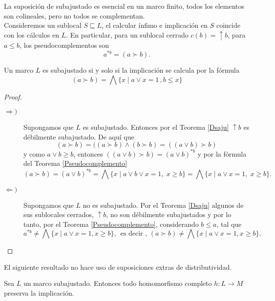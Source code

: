 La suposición de subajustado es esencial en un marco finito, todos los elementos son colineales, pero no todos se complementan.\\

Consideremos un sublocal $S\sqsubseteq L$, el calcular ínfimo e implicación en $S$ coincide con los cálculos en $L$. En particular, para un sublocal cerrado $c(b)=\uparrow b$, para $a\leq b$, los pseudocomplementos son 
\[
a^{*b}=(a\succ b).
\]

\begin{thm}\label{Fimplicación}
    Un marco $L$ es subajustado si y solo si la implicación se calcula por la fórmula 
    \[
    (a\succ b)=\bigwedge\{x\mid a\vee x=1\, ,b\leq x\}
    \]
\end{thm}

\begin{proof}
    \begin{description}
        \item[$\Rightarrow )$] Supongamos que $L$ es subajustado. Entonces por el Teorema \ref{Dsaju} $\uparrow b$ es débilmente subajustado. De aquí que 
        \[
        (a\succ b)=((a\succ b)\wedge (b\succ b)=((a\vee b)\succ b)
        \]
        y como $a\vee b\geq b$, entonces $((a\vee b)\succ b)=(a\vee b)^{*b}$ y por la fórmula del Teorema \ref{Pseudocomplemento}
        \[
        (a\succ b)=(a\vee b)^{*b}=\bigwedge\{x\mid a\vee b\vee x=1,\; x\geq b\}=\bigwedge\{x\mid a\vee x=1,\; x\geq b\}.
        \]
        \item[$\Leftarrow )$] Supongamos que $L$ no es subajustado. Por el Teorema \ref{Dsaju} algunos de sus sublocales cerrados, $\uparrow b$, no son débilmente subajustados y por lo tanto, por el Teorema \ref{Pseudocomplemento}, considerando $b\leq a$, tal que 
        \[
        a^{*b}\neq \bigwedge\{x\mid a\vee x=1, x\geq b\},\,\mbox{ es decir },\,(a\succ b)\neq \bigwedge\{x\mid a\vee x=1, x\geq b\}.
        \]
    \end{description}
\end{proof}

El siguiente resultado no hace uso de suposiciones extras de distributividad.

\begin{thm}
    Sea $L$ un marco subajustado. Entonces todo homomorfismo completo $h\colon L\to M$ preserva la implicación.
\end{thm}

